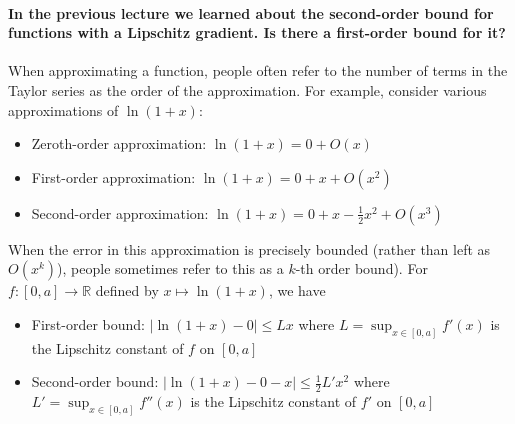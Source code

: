 \documentclass[10pt,english]{article}
\begin{document}
\paragraph{In the previous lecture we learned about the second-order bound for functions with a Lipschitz gradient. Is there a first-order bound for it?}
When approximating a function, people often refer to the number of terms in the Taylor series as the order of the approximation.
For example, consider various approximations of $\ln (1+x)$:
\begin{itemize}
\item Zeroth-order approximation: $\ln(1+x) = 0 + O(x)$
\item First-order approximation: $\ln(1+x) = 0 + x + O(x^2)$
\item Second-order approximation: $\ln(1+x) = 0 + x - \frac{1}{2}x^2 + O(x^3)$
\end{itemize}
When the error in this approximation is precisely bounded (rather than left as $O(x^k)$), people sometimes refer to this as a $k$-th order bound).
For $f\colon [0,a] \to \mathbb{R}$ defined by $x \mapsto \ln (1+x)$, we have
\begin{itemize}
\item First-order bound: $|\ln(1+x) - 0| \leq L x $ where $L= \sup_{x\in[0,a]} f'(x)$ is the Lipschitz constant of $f$ on $[0,a]$
\item Second-order bound: $|\ln(1+x) - 0 - x| \leq \frac{1}{2} L' x^2$ where $L' = \sup_{x\in[0,a]} f''(x)$ is the Lipschitz constant of $f'$ on $[0,a]$
\end{itemize}
\end{document}
